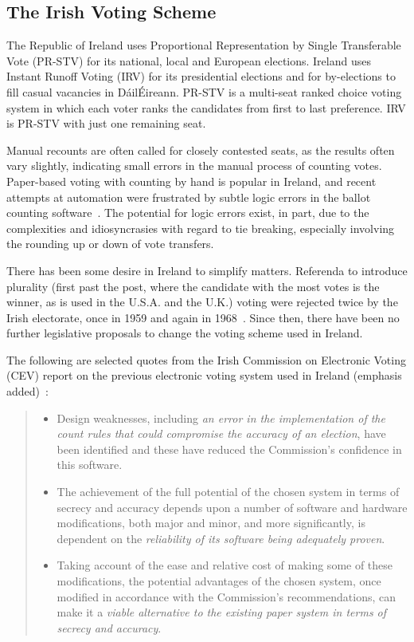 \documentclass[runningheads,a4paper]{llncs}
\newcommand{\eireann}{\'{E}ireann}
\newcommand{\dail}{D\'{a}il\xspace}
\begin{document}
\subsection{The Irish Voting Scheme}

The Republic of Ireland uses Proportional Representation by Single
Transferable Vote (PR-STV) for its national, local and European
elections.  Ireland uses Instant Runoff Voting (IRV) for its
presidential elections and for by-elections to fill casual vacancies
in \dail \eireann.  PR-STV is a multi-seat ranked choice voting system
in which each voter ranks the candidates from first to last
preference.  IRV is PR-STV with just one remaining seat.

Manual recounts are often called for closely contested seats, as the
results often vary slightly, indicating small errors in the manual
process of counting votes.  Paper-based voting with counting by hand
is popular in Ireland, and recent attempts at automation were
frustrated by subtle logic errors in the ballot counting
software~\cite{Coyle2004}.  The potential for logic errors exist, in
part, due to the complexities and idiosyncrasies with regard to tie
breaking, especially involving the rounding up or down of vote
transfers.

There has been some desire in Ireland to simplify matters.  Referenda
to introduce plurality (first past the post, where the candidate with
the most votes is the winner, as is used in the U.S.A. and the U.K.)
voting were rejected twice by the Irish electorate, once in 1959 and
again in 1968~\cite{sinnott1995irish}.  Since then, there have been no
further legislative proposals to change the voting scheme used in
Ireland.

The following are selected quotes from the Irish Commission on
Electronic Voting (CEV) report on the previous electronic voting
system used in Ireland (emphasis added)~\cite{CEV00}:
\begin{quote}
  \begin{itemize}    
  \item Design weaknesses, including \emph{an error in the
      implementation of the count rules that could compromise the
      accuracy of an election}, have been identified and these have
    reduced the Commission's confidence in this software.

  \item The achievement of the full potential of the chosen system in
    terms of secrecy and accuracy depends upon a number of software
    and hardware modifications, both major and minor, and more
    significantly, is dependent on the \emph{reliability of its software
    being adequately proven}.

  \item Taking account of the ease and relative cost of making some of
    these modifications, the potential advantages of the chosen
    system, once modified in accordance with the Commission's
    recommendations, can make it a \emph{viable alternative to the existing
    paper system in terms of secrecy and accuracy}.
  \end{itemize}
\end{quote}
\end{document}
